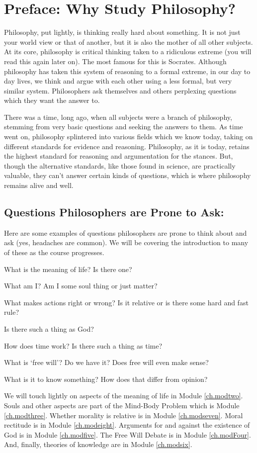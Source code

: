 \chapter*{Preface: Why Study Philosophy?}
Philosophy, put lightly, is thinking really hard about something. It is not just your world view or that of another, but it is also the mother of all other subjects. At its core, philosophy is critical thinking taken to a ridiculous extreme (you will read this again later on). The most famous for this is Socrates. Although philosophy has taken this system of reasoning to a formal extreme, in our day to day lives, we think and argue with each other using a less formal, but very similar system. Philosophers ask themselves and others perplexing questions which they want the answer to. 

There was a time, long ago, when all subjects were a branch of philosophy, stemming from very basic questions and seeking the answers to them. As time went on, philosophy splintered into various fields which we know today, taking on different standards for evidence and reasoning. Philosophy, as it is today, retains the highest standard for reasoning and argumentation for the stances. But, though the alternative standards, like those found in science, are practically valuable, they can't answer certain kinds of questions, which is where philosophy remains alive and well.  
\section{Questions Philosophers are Prone to Ask:}

Here are some examples of questions philosophers are prone to think about and ask (yes, headaches are common). We will be covering the introduction to many of these as the course progresses.
\begin{earg}
    \item[]What is the meaning of life? Is there one? 
    \item[]What am I? Am I some soul thing or just matter?
    \item[]What makes actions right or wrong? Is it relative or is there some hard and fast rule?
    \item[]Is there such a thing as God?
    \item[]How does time work? Is there such a thing as time?
    \item[]What is ‘free will’? Do we have it? Does free will even make sense?
    \item[]What is it to know something? How does that differ from opinion?
\end{earg}
We will touch lightly on aspects of the meaning of life in Module \ref{ch.modtwo}. Souls and other aspects are part of the Mind-Body Problem which is Module \ref{ch.modthree}. Whether morality is relative is in Module \ref{ch.modseven}. Moral rectitude is in Module \ref{ch.modeight}. Arguments for and against the existence of God is in Module \ref{ch.modfive}. The Free Will Debate is in Module \ref{ch.modFour}. And, finally, theories of knowledge are in Module \ref{ch.modsix}. 


